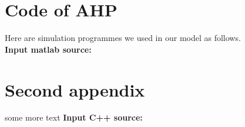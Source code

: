 \documentclass{mcmthesis}
\begin{document}









\begin{appendices}

\section{Code of AHP}

Here are simulation programmes we used in our model as follows.\\

\textbf{\textcolor[rgb]{0.98,0.00,0.00}{Input matlab source:}}


\section{Second appendix}

some more text \textcolor[rgb]{0.98,0.00,0.00}{\textbf{Input C++ source:}}


\end{appendices}
\end{document}
